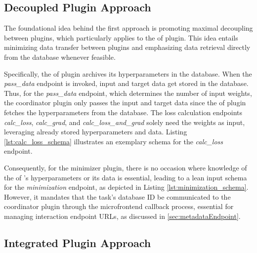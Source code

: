 \documentclass[
  a4paper,  %
  twoside,  %
  bibliography=totoc,
  headsepline,
  cleardoublepage=empty,
  parskip=half,
  draft=false
]{scrbook}
\begin{document}
\subsection{Decoupled Plugin Approach}
\label{sec:firstApproach}

The foundational idea behind the first approach is promoting maximal decoupling between plugins, which particularly applies to the \gls{of} plugin.
This idea entails minimizing data transfer between plugins and emphasizing data retrieval directly from the database whenever feasible.

Specifically, the \gls{of} plugin archives its hyperparameters in the database.
When the \emph{pass\_data} endpoint is invoked, input and target data get stored in the database.
Thus, for the \emph{pass\_data} endpoint, which determines the number of input weights, the coordinator plugin only passes the input and target data since the \gls{of} plugin fetches the hyperparameters from the database.
The loss calculation endpoints \emph{calc\_loss}, \emph{calc\_grad}, and \emph{calc\_loss\_and\_grad} solely need the weights as input, leveraging already stored hyperparameters and data.
Listing \ref{lst:calc_loss_schema} illustrates an exemplary schema for the \emph{calc\_loss} endpoint.

Consequently, for the minimizer plugin, there is no occasion where knowledge of the \gls{of} 's hyperparameters or its data is essential, leading to a lean input schema for the \emph{minimization} endpoint, as depicted in Listing \ref{lst:minimization_schema}.
However, it mandates that the task's database ID be communicated to the coordinator plugin through the microfrontend callback process, essential for managing interaction endpoint URLs, as discussed in \ref{sec:metadataEndpoint}.

\noindent\begin{minipage}{\linewidth}
  
\end{minipage}

\noindent\begin{minipage}{\linewidth}
  
\end{minipage}

\subsection{Integrated Plugin Approach}
\label{sec:secondApproach}
\end{document}
